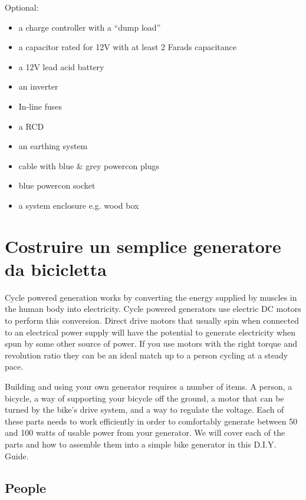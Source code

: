 \documentclass{article}
\theoremstyle{definition}
\theoremstyle{definition}
\theoremstyle{remark}
\begin{document}
    Optional:

    \begin{itemize}
      \item a charge controller with a “dump load”
      \item a capacitor rated for 12V with at least 2 Farads capacitance
      \item a 12V lead acid battery
      \item an inverter
      \item In-line fuses
      \item a RCD
      \item an earthing system
      \item cable with blue \& grey powercon plugs
      \item blue powercon socket
      \item a system enclosure e.g. wood box
    \end{itemize}



\newpage

{\color{blue}\section{Costruire un semplice generatore da bicicletta}} %
\label{sec:costruire_un_semplice_generatore_da_bicicletta}

  Cycle powered generation works by converting the energy supplied by muscles in the human body into electricity. Cycle powered generators use electric DC motors to perform this conversion. Direct drive motors that usually spin when connected to an electrical power supply will have the potential to generate electricity when spun by some other source of power. If you use motors with the right torque and revolution ratio they can be an ideal match up to a person cycling at a steady pace.

  Building and using your own generator requires a number of items. A person, a bicycle, a way of supporting your bicycle off the ground, a motor that can be turned by the bike’s drive system, and a way to regulate the voltage. Each of these parts needs to work efficiently in order to comfortably generate between 50 and 100 watts of usable power from your generator. We will cover each of the parts and how to assemble them into a simple bike generator in this D.I.Y. Guide.

  {\color{blue}\subsection{People}} %
  \label{sub:people}
\end{document}

